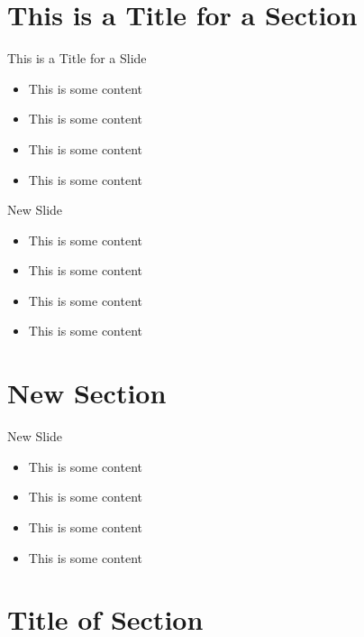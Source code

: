 \hypertarget{this-is-a-title-for-a-section}{%
\section{This is a Title for a
Section}\label{this-is-a-title-for-a-section}}

\begin{frame}{This is a Title for a Slide}
\protect\hypertarget{this-is-a-title-for-a-slide}{}
\begin{itemize}
\tightlist
\item
  This is some content
\item
  This is some content
\item
  This is some content
\item
  This is some content
\end{itemize}
\end{frame}

\begin{frame}{New Slide}
\protect\hypertarget{new-slide}{}
\begin{itemize}
\tightlist
\item
  This is some content
\item
  This is some content
\item
  This is some content
\item
  This is some content
\end{itemize}
\end{frame}

\hypertarget{new-section}{%
\section{New Section}\label{new-section}}

\begin{frame}{New Slide}
\protect\hypertarget{new-slide-1}{}
\begin{itemize}
\tightlist
\item
  This is some content
\item
  This is some content
\item
  This is some content
\item
  This is some content
\end{itemize}
\end{frame}

\hypertarget{title-of-section}{%
\section{Title of Section}\label{title-of-section}}

